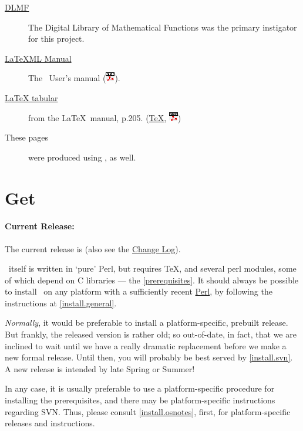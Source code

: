 \documentclass{article}
\newcommand{\PDFIcon}{\includegraphics{pdf}}
\begin{document}
\begin{description}
\item[\href{http://dlmf.nist.gov/}{DLMF}]
   The Digital Library of Mathematical Functions was the
   primary instigator for this project.
\item[\href{manual/}{LaTeXML Manual}]
   The \LaTeXML\ User's manual (\href{manual.pdf}{\PDFIcon}).
\item[\href{examples/tabular/tabular.html}{LaTeX tabular}]
    from the \LaTeX\ manual, p.205.
    (\href{examples/tabular/tabular.tex}{\TeX},
     \href{examples/tabular/tabular.pdf}{\PDFIcon})
\item[These pages] were produced using \LaTeXML, as well.
\end{description}


\section{Get \LaTeXML}\label{get}
\paragraph{Current Release:}\label{download.current}
The current release is \textbf{\CurrentVersion}
(also see the \href{Changes}{Change Log}).

\LaTeXML\ itself is written in `pure' Perl, but requires \TeX,
and several perl modules, some of which depend on C libraries --- the \ref{prerequisites}.
It should always be possible to install \LaTeXML\ on any platform
with a sufficiently recent \href{http://www.perl.org/}{Perl},
by following the instructions at \ref{install.general}.


\emph{Normally}, it would be preferable to install a platform-specific, prebuilt release.
But frankly, the released version is rather old;
so out-of-date, in fact, that we are inclined to wait until we
have a really dramatic replacement before we make a new formal release.
Until then, you will probably be best served by \ref{install.svn}.
A new release is intended by late Spring or Summer!

In any case, it is usually preferable to use a platform-specific procedure
for installing the prerequisites, and there may be platform-specific
instructions regarding SVN.
Thus, please consult \ref{install.osnotes}, first,
for platform-specific releases and instructions.
\end{document}
